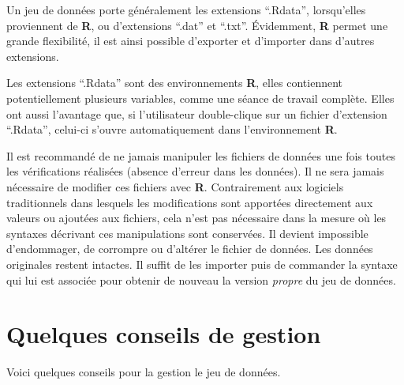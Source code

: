 \documentclass[
]{book}
\begin{document}
Un jeu de données porte généralement les extensions ``.Rdata'', lorsqu'elles proviennent de \textbf{R}, ou d'extensions ``.dat'' et ``.txt''. Évidemment, \textbf{R} permet une grande flexibilité, il est ainsi possible d'exporter et d'importer dans d'autres extensions.

Les extensions ``.Rdata'' sont des environnements \textbf{R}, elles contiennent potentiellement plusieurs variables, comme une séance de travail complète. Elles ont aussi l'avantage que, si l'utilisateur double-clique sur un fichier d'extension ``.Rdata'', celui-ci s'ouvre automatiquement dans l'environnement \textbf{R}.

Il est recommandé de ne jamais manipuler les fichiers de données une fois toutes les vérifications réalisées (absence d'erreur dans les données). Il ne sera jamais nécessaire de modifier ces fichiers avec \textbf{R}. Contrairement aux logiciels traditionnels dans lesquels les modifications sont apportées directement aux valeurs ou ajoutées aux fichiers, cela n'est pas nécessaire dans la mesure où les syntaxes décrivant ces manipulations sont conservées. Il devient impossible d'endommager, de corrompre ou d'altérer le fichier de données. Les données originales restent intactes. Il suffit de les importer puis de commander la syntaxe qui lui est associée pour obtenir de nouveau la version \emph{propre} du jeu de données.

\hypertarget{quelques-conseils-de-gestion}{%
\section{Quelques conseils de gestion}\label{quelques-conseils-de-gestion}}

Voici quelques conseils pour la gestion le jeu de données.
\end{document}
